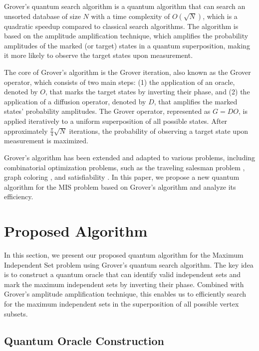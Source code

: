 Grover's quantum search algorithm \cite{grover1996fast} is a quantum algorithm that can search an unsorted database of size $N$ with a time complexity of $O(\sqrt{N})$, which is a quadratic speedup compared to classical search algorithms. The algorithm is based on the amplitude amplification technique, which amplifies the probability amplitudes of the marked (or target) states in a quantum superposition, making it more likely to observe the target states upon measurement.

The core of Grover's algorithm is the Grover iteration, also known as the Grover operator, which consists of two main steps: (1) the application of an oracle, denoted by $O$, that marks the target states by inverting their phase, and (2) the application of a diffusion operator, denoted by $D$, that amplifies the marked states' probability amplitudes. The Grover operator, represented as $G = D O$, is applied iteratively to a uniform superposition of all possible states. After approximately $\frac{\pi}{4}\sqrt{N}$ iterations, the probability of observing a target state upon measurement is maximized.

Grover's algorithm has been extended and adapted to various problems, including combinatorial optimization problems, such as the traveling salesman problem \cite{zalka1999grover}, graph coloring \cite{childs2000quantum}, and satisfiability \cite{schaller1996search}. In this paper, we propose a new quantum algorithm for the MIS problem based on Grover's algorithm and analyze its efficiency.

\section{Proposed Algorithm}
\label{sec:algorithm}

In this section, we present our proposed quantum algorithm for the Maximum Independent Set problem using Grover's quantum search algorithm. The key idea is to construct a quantum oracle that can identify valid independent sets and mark the maximum independent sets by inverting their phase. Combined with Grover's amplitude amplification technique, this enables us to efficiently search for the maximum independent sets in the superposition of all possible vertex subsets.

\subsection{Quantum Oracle Construction}
\label{subsec:oracle_construction}


